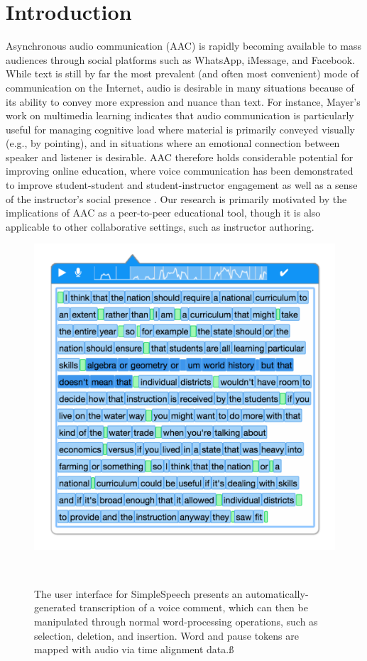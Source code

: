 \section{Introduction}

Asynchronous audio communication (AAC) is rapidly becoming available to mass audiences through social platforms such as WhatsApp, iMessage, and Facebook. 
While text is still by far the most prevalent (and often most convenient) mode of communication on the Internet, audio is desirable in many situations because of its ability to convey more expression and nuance than text.
For instance, Mayer's work on multimedia learning \cite{mayer} indicates that audio communication is particularly useful for managing cognitive load where material is primarily conveyed visually (e.g., by pointing), and in situations where an emotional connection between speaker and listener is desirable.
AAC therefore holds considerable potential for improving online education, where voice communication has been demonstrated to improve student-student and student-instructor engagement as well as a sense of the instructor's social presence \cite{ice,oomen,tu}. 
Our research is primarily motivated by the implications of AAC as a peer-to-peer educational tool, though it is also applicable to other collaborative settings, such as instructor authoring.

\begin{figure}
	\centering
	\includegraphics[width=\columnwidth,keepaspectratio]{figures/large_screenshot}
	\caption{The user interface for SimpleSpeech presents an automatically-generated transcription of a voice comment, which can then be manipulated through normal word-processing operations, such as selection, deletion, and insertion. Word and pause tokens are mapped with audio via time alignment data.ß}~\label{fig:overview_shot}
\end{figure}

